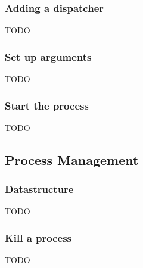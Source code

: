 \subsubsection{Adding a dispatcher}
TODO

\subsubsection{Set up arguments}
TODO

\subsubsection{Start the process}
TODO


\subsection{Process Management}

\subsubsection{Datastructure}
TODO

\subsubsection{Kill a process}
TODO
